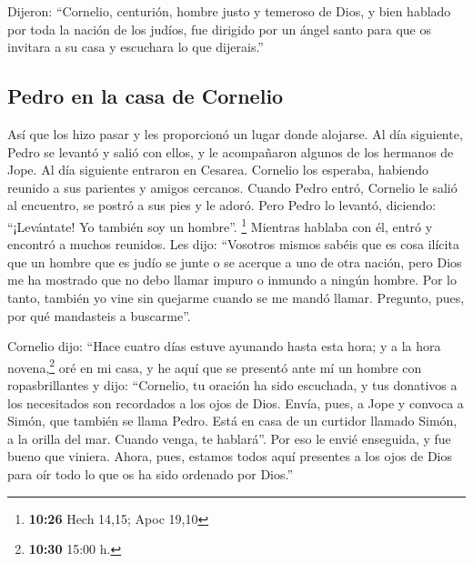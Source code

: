 \begin{paracol}{2}
 Dijeron: ``Cornelio, centurión, hombre justo y temeroso
de Dios, y bien hablado por toda la nación de los judíos, fue dirigido
por un ángel santo para que os invitara a su casa y escuchara lo que
dijerais.''

\hypertarget{pedro-en-la-casa-de-cornelio}{%
\subsection{Pedro en la casa de
Cornelio}\label{pedro-en-la-casa-de-cornelio}}

 Así que los hizo pasar y les proporcionó un lugar donde
alojarse. Al día siguiente, Pedro se levantó y salió con ellos, y le
acompañaron algunos de los hermanos de Jope.  Al día
siguiente entraron en Cesarea. Cornelio los esperaba, habiendo reunido a
sus parientes y amigos cercanos.  Cuando Pedro entró,
Cornelio le salió al encuentro, se postró a sus pies y le adoró.
 Pero Pedro lo levantó, diciendo: ``¡Levántate! Yo
también soy un hombre''. \footnote{\textbf{10:26} Hech 14,15; Apoc 19,10}
 Mientras hablaba con él, entró y encontró a muchos
reunidos.  Les dijo: ``Vosotros mismos sabéis que es cosa
ilícita que un hombre que es judío se junte o se acerque a uno de otra
nación, pero Dios me ha mostrado que no debo llamar impuro o inmundo a
ningún hombre.  Por lo tanto, también yo vine sin
quejarme cuando se me mandó llamar. Pregunto, pues, por qué mandasteis a
buscarme''.

 Cornelio dijo: ``Hace cuatro días estuve ayunando hasta
esta hora; y a la hora novena,\footnote{\textbf{10:30} 15:00 h.} oré en
mi casa, y he aquí que se presentó ante mí un hombre con ropasbrillantes
 y dijo: ``Cornelio, tu oración ha sido escuchada, y tus
donativos a los necesitados son recordados a los ojos de Dios.
 Envía, pues, a Jope y convoca a Simón, que también se
llama Pedro. Está en casa de un curtidor llamado Simón, a la orilla del
mar. Cuando venga, te hablará''.  Por eso le envié
enseguida, y fue bueno que viniera. Ahora, pues, estamos todos aquí
presentes a los ojos de Dios para oír todo lo que os ha sido ordenado
por Dios.''


\end{paracol}
